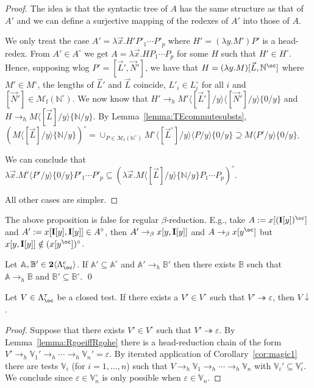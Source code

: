 \documentclass{LMCS}
\newcommand{\bool}{\mathbf{2}}
\newcommand{\lam}{\ensuremath{\lambda}}
\newcommand{\bang}{\oc}
\newcommand{\FSet}[1]{\Lambda^{#1}_{\bang}}
\newcommand{\Fsums}[1]{\bool\langle\FSet{#1}\rangle}
\newcommand{\msto}{\twoheadrightarrow}
\newcommand{\toh}{\to_{h}}\newcommand{\mstoh}{\msto_{h}}\newcommand{\lsubst}[2]{\langle #2 / #1 \rangle}	\newcommand{\llsubst}[2]{\langle\!\langle #2 / #1 \rangle\!\rangle}
\newcommand{\subst}[2]{\{ #2 / #1 \}}	\newcommand{\dg}[2]{\mathrm{deg}_{#1}(#2)} \newcommand{\obsle}{\sqsubseteq_{\mathcal{O}}}
\newcommand{\TE}[1]{#1^{\circ}} \newcommand{\at}{\!::\!}
\newcommand{\Mfin}[1]{\mathcal{M}_{\mathrm{f}}(#1)}
\newcommand{\ass}{:=}
\newcommand{\seq}[1]{\vec{#1}}
\newcommand{\sA}{\mathbb{A}}
\newcommand{\sB}{\mathbb{B}}
\newcommand{\sN}{\mathbb{N}}
\newcommand{\sV}{\mathbb{V}}
\newcommand{\gt}{\ensuremath{\tau}}
\newcommand{\cOnv}[1]{#1\!\downarrow} \renewcommand{\div}[1]{#1\!\uparrow} \newcommand{\module}[1]{\bool\langle #1 \rangle}
\begin{document}
\begin{proof} 
The idea is that the syntactic tree of $A$ has the same structure as that of $A'$
and we can define a surjective mapping of the redexes of $A'$ into those of $A$.

We only treat the case $A' = \lam\seq x.H'P'_1\cdots P'_p$ where $H' = (\lam y.M')P'$ is a head-redex.
From $A'\in\TE{A}$ we get $A = \lam\seq x.HP_1\cdots P_p$ for some $H$ such that $H'\in\TE{H}$.
Hence, supposing wlog $P'=[\seq L',\seq N']$, we have that $H = (\lam y.M)[\seq L,\sN^\bang]$ where $M'\in\TE{M}$, 
the lengths of $\seq L'$ and $\seq L$ coincide, $L'_i\in\TE{L_i}$ for all $i$ and $[\seq N']\in\Mfin{\TE{\sN}}$.
We now know that $H'\toh M'\lsubst{y}{[\seq L']}\lsubst{y}{[\seq N']}\subst{y}{0}$ and
$H\toh M\lsubst{y}{[\seq L]}\subst{y}{\sN}$.
By Lemma~\ref{lemma:TEcommutesubsts}, 
$\TE{(M\lsubst{y}{[\seq L]}\subst{y}{\sN})} = \cup_{P\in\Mfin{\TE{\sN}}}\TE{M}\lsubst{y}{[\TE{\seq L}]}\lsubst{y}{P}\subst{y}{0}
\supseteq M\lsubst{y}{P'}\subst{y}{0}$.

We can conclude that 
$\lam\seq x.M'\lsubst{y}{P'}\subst{y}{0}P'_1\cdots P'_p \subseteq\TE{(\lam \seq x.M\lsubst{y}{[\seq L]}\subst{y}{\sN}P_1\cdots P_p)}$.

All other cases are simpler.
\end{proof}

\begin{rem}
The above proposition is false for regular $\beta$-reduction.
E.g., take $A\ass x[(\bold{I}[y])^\bang]$ and $A'\ass x[\bold{I}[y],\bold{I}[y]]\in\TE{A}$, then 
$A'\to_\beta x[y,\bold{I}[y]]$ and $A\to_\beta x[y^\bang]$ but $x[y,\bold{I}[y]]\notin\TE{( x[y^\bang])}$.
\end{rem}

\begin{cor}\label{cor:magic1} 
Let $\sA,\sB'\in\Fsums{e}$.
If $\sA'\subseteq\TE\sA$ and $\sA'\to_h\sB'$ then there exists $\sB$ 
such that $\sA\to_h\sB$ and $\sB'\subseteq\TE\sB$. \qed
\end{cor}

\begin{cor}\label{cor:magic} 
Let $V\in \FSet{\gt}$ be a closed test. 
If there exists a $V'\in\TE{V}$ such that $V'\msto\varepsilon$,
then $\cOnv{V}$.
\end{cor}

\begin{proof}
Suppose that there exists $V'\in\TE{V}$ such that $V' \msto \varepsilon$.
By Lemma~\ref{lemma:RgoeiffRgohe} there is a head-reduction chain of the form
$V' \to_h  \sV_1' \to_h \cdots \to_h \sV_n' = \varepsilon$.
By iterated application of Corollary~\ref{cor:magic1} there are tests 
$\sV_i$ (for $i=1,\ldots,n$) such that $V \to_h \sV_1 \to_h \cdots \to_h \sV_{n}$ 
with $\sV_i' \subseteq \TE{\sV_i}$. 
We conclude since $\varepsilon \in \TE{\sV_n}$ is only possible when $ \varepsilon\in\sV_n $. 
\end{proof}
\end{document}
